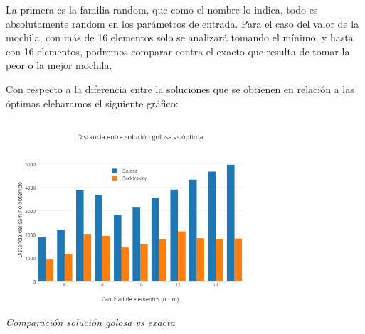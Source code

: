 La primera es la familia random, que como el nombre lo indica, todo es absolutamente random en los parámetros de entrada.
Para el caso del valor de la mochila, con más de 16 elementos solo se analizará tomando el mínimo, y hasta con 16 elementos, podremos comparar contra el exacto que resulta de tomar la peor o la mejor mochila.

\begin{figure} [!ht]
 \centering
       \label{fig:randomexacto}
    \label{fig:randomgoloso}
    \end{figure}
 
 
Con respecto a la diferencia entre la soluciones que se obtienen en relaci\'on a las \'optimas elebaramos el siguiente gráfico:\\
 
\vspace*{0.3cm} \vspace*{0.3cm}
  \begin{center}
 \includegraphics[width=0.75\textwidth]{./EJ2/random.png}
\\{\textit{Comparación solución golosa vs exacta}}
  \end{center}

